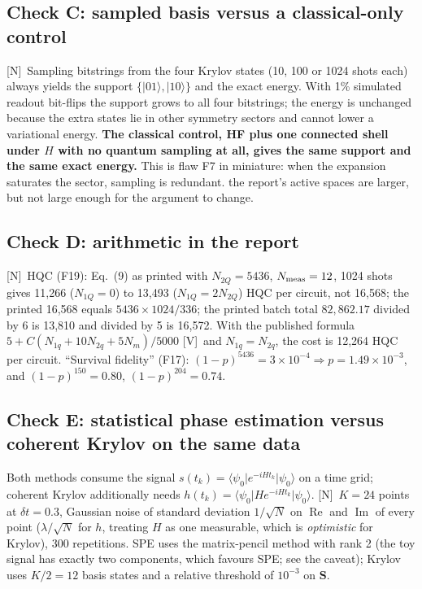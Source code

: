 \documentclass[11pt,a4paper]{article}
\newcommand{\ket}[1]{\lvert #1\rangle}
\newcommand{\bra}[1]{\langle #1\rvert}
\newcommand{\report}{the report}
\newcommand{\lV}{\textcolor{keyblue}{[V]}}   %
\newcommand{\lN}{\textcolor{keyblue}{[N]}}   %
\begin{document}
\subsection{Check C: sampled basis versus a classical-only control}
\lN\ Sampling bitstrings from the four Krylov states (10, 100 or 1024 shots each) always yields the support $\{\ket{01},\ket{10}\}$ and the exact energy. With 1\% simulated readout bit-flips the support grows to all four bitstrings; the energy is unchanged because the extra states lie in other symmetry sectors and cannot lower a variational energy. \textbf{The classical control, HF plus one connected shell under $H$ with no quantum sampling at all, gives the same support and the same exact energy.} This is flaw F7 in miniature: when the expansion saturates the sector, sampling is redundant. \report's active spaces are larger, but not large enough for the argument to change.

\subsection{Check D: arithmetic in the report}
\lN\ HQC (F19): Eq.~(9) as printed with $N_{2Q}=5436$, $N_{\rm meas}=12$, 1024 shots gives 11,266 ($N_{1Q}=0$) to 13,493 ($N_{1Q}=2N_{2Q}$) HQC per circuit, not 16,568; the printed 16,568 equals $5436\times1024/336$; the printed batch total $82{,}862.17$ divided by 6 is 13,810 and divided by 5 is 16,572. With the published formula $5+C(N_{1q}+10N_{2q}+5N_m)/5000$ \lV\ and $N_{1q}=N_{2q}$, the cost is 12,264 HQC per circuit. ``Survival fidelity'' (F17): $(1-p)^{5436}=3\times10^{-4}\Rightarrow p=1.49\times10^{-3}$, and $(1-p)^{150}=0.80$, $(1-p)^{204}=0.74$.

\subsection{Check E: statistical phase estimation versus coherent Krylov on the same data}\label{sec:checkE}
Both methods consume the signal $s(t_k)=\bra{\psi_0}e^{-iHt_k}\ket{\psi_0}$ on a time grid; coherent Krylov additionally needs $h(t_k)=\bra{\psi_0}He^{-iHt_k}\ket{\psi_0}$. \lN\ $K=24$ points at $\delta t=0.3$, Gaussian noise of standard deviation $1/\sqrt N$ on $\operatorname{Re}$ and $\operatorname{Im}$ of every point ($\lambda/\sqrt N$ for $h$, treating $H$ as one measurable, which is \emph{optimistic} for Krylov), 300 repetitions. SPE uses the matrix-pencil method with rank 2 (the toy signal has exactly two components, which favours SPE; see the caveat); Krylov uses $K/2=12$ basis states and a relative threshold of $10^{-3}$ on $\mathbf S$.
\end{document}
